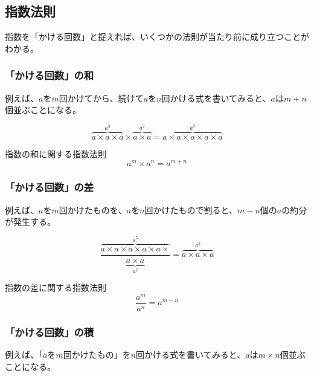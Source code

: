 \documentclass[../math-imaging]{subfiles}
\begin{document}
\subsection{指数法則}

指数を「かける回数」と捉えれば、いくつかの法則が当たり前に成り立つことがわかる。

\subsubsection{「かける回数」の和}

例えば、$a$を$m$回かけてから、続けて$a$を$n$回かける式を書いてみると、$a$は$m+n$個並ぶことになる。

\begin{equation}
  \overbrace{a\times a\times a}^{a^3} \times \overbrace{a\times a}^{a^2} = \overbrace{a\times a\times a\times a\times a}^{a^5}
\end{equation}

\begin{theorem}{指数の和に関する指数法則}
  \LARGE
  \begin{equation}
    a^m \times a^n = a^{m+n}
  \end{equation}
\end{theorem}

\subsubsection{「かける回数」の差}

例えば、$a$を$m$回かけたものを、$a$を$n$回かけたもので割ると、$m-n$個の$a$の約分が発生する。

\begin{equation}
  \dfrac{\overbrace{a\times a\times a\times a\times a\times}^{a^5}}{\underbrace{a\times a}_{a^2}} = \overbrace{a\times a\times a}^{a^3}
\end{equation}

\begin{theorem}{指数の差に関する指数法則}
  \LARGE
  \begin{equation}
    \dfrac{a^m}{a^n} = a^{m-n}
  \end{equation}
\end{theorem}

\subsubsection{「かける回数」の積}

例えば、「$a$を$m$回かけたもの」を$n$回かける式を書いてみると、$a$は$m \times n$個並ぶことになる。
\end{document}
